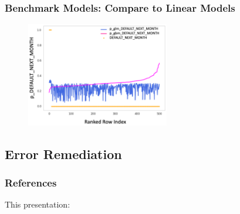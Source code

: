 \documentclass[11pt,
               aspectratio=43,
               hyperref={colorlinks}
               ]{beamer}
\begin{document}
			\begin{frame}
		
				\frametitle{\textbf{Benchmark Models}: Compare to Linear Models}
				\begin{figure}[htb]
					\begin{center}
						\includegraphics[height=130pt]{img/benchmark.png}
					\end{center}
				\end{figure}	
				
			\end{frame}




		\subsection{Error Remediation}






	\begin{frame}[t, allowframebreaks]
	
		\frametitle{References}	
		
			This presentation:\\
					
		\framebreak		
		
		\printbibliography
		
	\end{frame}
\end{document}
